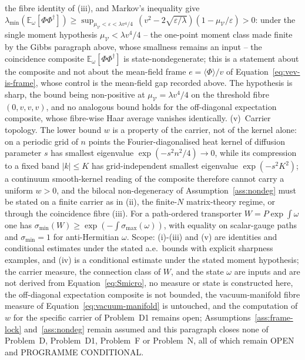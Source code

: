 the fibre identity of (iii), and Markov's inequality give \(\lambda_{\min}(\mathbb E_\omega[\Phi\Phi^\dagger])\ge\sup_{\mu_{\mathcal V}<\varepsilon<\lambda v^4/4}\,(v^2-2\sqrt{\varepsilon/\lambda})(1-\mu_{\mathcal V}/\varepsilon)>0\): under the single moment hypothesis \(\mu_{\mathcal V}<\lambda v^4/4\) -- the one-point moment class made finite by the Gibbs paragraph above, whose smallness remains an input -- the coincidence composite \(\mathbb E_\omega[\Phi\Phi^\dagger]\) is state-nondegenerate; this is a statement about the composite and not about the mean-field frame \(e=\langle\Phi\rangle/v\) of Equation~\eqref{eq:vev-is-frame}, whose control is the mean-field gap recorded above. The hypothesis is sharp, the bound being non-positive at \(\mu_{\mathcal V}=\lambda v^4/4\) on the threshold fibre \((0,v,v,v)\), and no analogous bound holds for the off-diagonal expectation composite, whose fibre-wise Haar average vanishes identically. (v)~Carrier topology. The lower bound \(w\) is a property of the carrier, not of the kernel alone: on a periodic grid of \(n\) points the Fourier-diagonalised heat kernel of diffusion parameter \(s\) has smallest eigenvalue \(\exp(-s^2 n^2/4)\to0\), while its compression to a fixed band \(|k|\le K\) has grid-independent smallest eigenvalue \(\exp(-s^2K^2)\); a continuum smooth-kernel reading of the composite therefore cannot carry a uniform \(w>0\), and the bilocal non-degeneracy of Assumption~\ref{ass:nondeg} must be stated on a finite carrier as in (ii), the finite-\(N\) matrix-theory regime, or through the coincidence fibre (iii). For a path-ordered transporter \(W=P\exp\int\omega\) one has \(\sigma_{\min}(W)\ge\exp(-\int\sigma_{\max}(\omega))\), with equality on scalar-gauge paths and \(\sigma_{\min}=1\) for anti-Hermitian \(\omega\). Scope: (i)-(iii) and (v) are identities and conditional estimates under the stated a.e.\ bounds with explicit sharpness examples, and (iv) is a conditional estimate under the stated moment hypothesis; the carrier measure, the connection class of \(W\), and the state \(\omega\) are inputs and are not derived from Equation~\eqref{eq:Smicro}, no measure or state is constructed here, the off-diagonal expectation composite is not bounded, the vacuum-manifold fibre measure of Equation~\eqref{eq:vacuum-manifold} is untouched, and the computation of \(w\) for the specific carrier of Problem~D1 remains open; Assumptions~\ref{ass:frame-lock} and~\ref{ass:nondeg} remain assumed and this paragraph closes none of Problem~D, Problem~D1, Problem~F or Problem~N, all of which remain OPEN and PROGRAMME CONDITIONAL.



